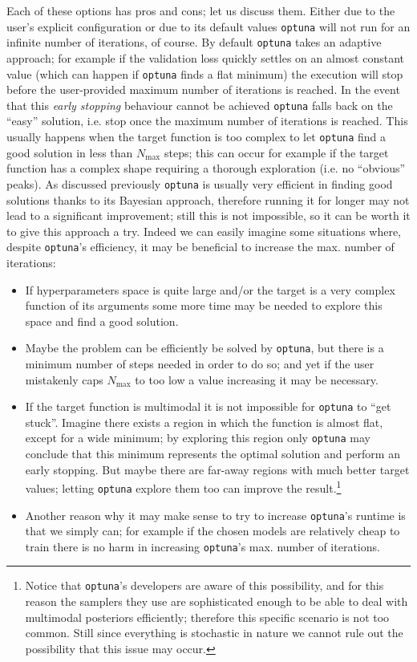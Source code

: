 Each of these options has pros and cons; let us discuss them.
Either due to the user's explicit configuration or due to its default values \texttt{optuna} will not run for an infinite number of iterations, of course. By default \texttt{optuna} takes an adaptive approach; for example if the validation loss quickly settles on an almost constant value (which can happen if \texttt{optuna} finds a flat minimum) the execution will stop before the user-provided maximum number of iterations is reached. In the event that this \emph{early stopping} behaviour cannot be achieved \texttt{optuna} falls back on the ``easy'' solution, i.e. stop once the maximum number of iterations is reached. This usually happens when the target function is too complex to let \texttt{optuna} find a good solution in less than $N_{\text{max}}$ steps; this can occur for example if the target function has a complex shape requiring a thorough exploration (i.e. no ``obvious'' peaks). 
As discussed previously \texttt{optuna} is usually very efficient in finding good solutions thanks to its Bayesian approach, therefore running it for longer may not lead to a significant improvement; still this is not impossible, so it can be worth it to give this approach a try. Indeed we can easily imagine some situations where, despite \texttt{optuna}'s efficiency, it may be beneficial to increase the max. number of iterations:
\begin{itemize}
    \item If hyperparameters space is quite large and/or the target is a very complex function of its arguments some more time may be needed to explore this space and find a good solution.
    \item Maybe the problem can be efficiently be solved by \texttt{optuna}, but there is a minimum number of steps needed in order to do so; and yet if the user mistakenly caps $N_{\text{max}}$ to too low a value increasing it may be necessary.
    \item If the target function is multimodal it is not impossible for \texttt{optuna} to ``get stuck''. Imagine there exists a region in which the function is almost flat, except for a wide minimum; by exploring this region only \texttt{optuna} may conclude that this minimum represents the optimal solution and perform an early stopping. But maybe there are far-away regions with much better target values; letting \texttt{optuna} explore them too can improve the result.\footnote{Notice that \texttt{optuna}'s developers are aware of this possibility, and for this reason the samplers they use are sophisticated enough to be able to deal with multimodal posteriors efficiently; therefore this specific scenario is not too common. Still since everything is stochastic in nature we cannot rule out the possibility that this issue may occur.}
    \item Another reason why it may make sense to try to increase \texttt{optuna}'s runtime is that we simply can; for example if the chosen models are relatively cheap to train there is no harm in increasing \texttt{optuna}'s max. number of iterations.
\end{itemize}

